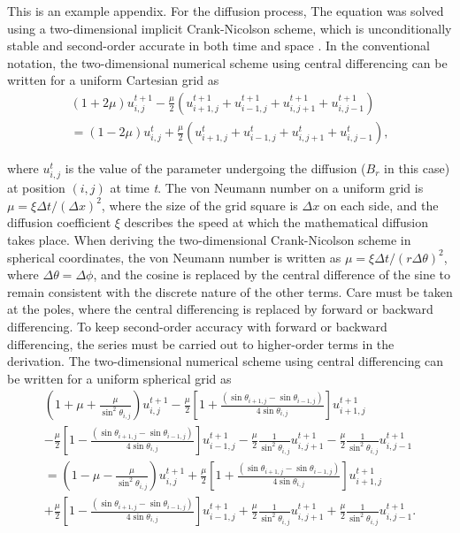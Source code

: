 This is an example appendix.
For the diffusion process, The equation was solved using a two-dimensional implicit Crank-Nicolson scheme, which is unconditionally stable and second-order accurate in both time and space \citep{crank47}. In the conventional notation, the two-dimensional numerical scheme using central differencing can be written for a uniform Cartesian grid as 
\begin{eqnarray}
\nonumber\left(1+2\mu\right)u^{t+1}_{i,j}-\frac{\mu}{2}\left(u^{t+1}_{i+1,j}+u^{t+1}_{i-1,j}+u^{t+1}_{i,j+1}+u^{t+1}_{i,j-1}\right)\\
=\left(1-2\mu\right)u^{t}_{i,j}+\frac{\mu}{2}\left(u^{t}_{i+1,j}+u^{t}_{i-1,j}+u^{t}_{i,j+1}+u^{t}_{i,j-1}\right),
\end{eqnarray}

\noindent where $u^{t}_{i,j}$ is the value of the parameter undergoing the diffusion ($B_{r}$ in this case) at position $(i, j)$ at time \textit{t}. The von Neumann number on a uniform grid is $\mu=\xi{\Delta}t/\left({\Delta}x\right)^{2}$, where the size of the grid square is $\Delta x$ on each side, and the diffusion coefficient $\xi$ describes the speed at which the mathematical diffusion takes place. When deriving the two-dimensional Crank-Nicolson scheme in spherical coordinates, the von Neumann number is written as $\mu=\xi{\Delta}t/\left(r\Delta\theta\right)^{2}$, where $\Delta\theta=\Delta\phi$, and the cosine is replaced by the central difference of the sine to remain consistent with the discrete nature of the other terms. Care must be taken at the poles, where the central differencing is replaced by forward or backward differencing. To keep second-order accuracy with forward or backward differencing, the series must be carried out to higher-order terms in the derivation. The two-dimensional numerical scheme using central differencing can be written for a uniform spherical grid as
\begin{multline}
\left(1+\mu+\frac{\mu}{\sin^{2}\theta_{i,j}}\right)u^{t+1}_{i,j}-\frac{\mu}{2}\left[1+\frac{\left(\sin\theta_{i+1,j}-\sin\theta_{i-1,j}\right)}{4\sin\theta_{i,j}}\right]u^{t+1}_{i+1,j}\\
 -\frac{\mu}{2}\left[1-\frac{\left(\sin\theta_{i+1,j}-\sin\theta_{i-1,j}\right)}{4\sin\theta_{i,j}}\right]u^{t+1}_{i-1,j}-\frac{\mu}{2}\frac{1}{\sin^{2}\theta_{i,j}}u^{t+1}_{i,j+1}-\frac{\mu}{2}\frac{1}{\sin^{2}\theta_{i,j}}u^{t+1}_{i,j-1}\\
 =\left(1-\mu-\frac{\mu}{\sin^{2}\theta_{i,j}}\right)u^{t+1}_{i,j}+\frac{\mu}{2}\left[1+\frac{\left(\sin\theta_{i+1,j}-\sin\theta_{i-1,j}\right)}{4\sin\theta_{i,j}}\right]u^{t+1}_{i+1,j}\\
 +\frac{\mu}{2}\left[1-\frac{\left(\sin\theta_{i+1,j}-\sin\theta_{i-1,j}\right)}{4\sin\theta_{i,j}}\right]u^{t+1}_{i-1,j}+\frac{\mu}{2}\frac{1}{\sin^{2}\theta_{i,j}}u^{t+1}_{i,j+1}+\frac{\mu}{2}\frac{1}{\sin^{2}\theta_{i,j}}u^{t+1}_{i,j-1}.
 \label{CN Spherical}
\end{multline}

